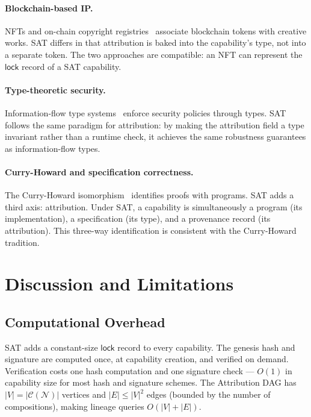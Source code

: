 \documentclass[12pt]{article}
\newcommand{\LOCK}{\mathsf{lock}}
\begin{document}
\paragraph{Blockchain-based IP.}
NFTs and on-chain copyright registries~\cite{bored2021} associate blockchain
tokens with creative works.  SAT differs in that attribution is baked into the
capability's type, not into a separate token.  The two approaches are
compatible: an NFT can represent the $\LOCK$ record of a SAT capability.

\paragraph{Type-theoretic security.}
Information-flow type systems~\cite{volpano1997, heintze1998} enforce security
policies through types.  SAT follows the same paradigm for attribution: by
making the attribution field a type invariant rather than a runtime check, it
achieves the same robustness guarantees as information-flow types.

\paragraph{Curry-Howard and specification correctness.}
The Curry-Howard isomorphism~\cite{howard1980} identifies proofs with programs.
SAT adds a third axis: attribution.  Under SAT, a capability is simultaneously
a program (its implementation), a specification (its type), and a provenance
record (its attribution).  This three-way identification is consistent with the
Curry-Howard tradition.

\section{Discussion and Limitations}
\label{sec:discussion}

\subsection{Computational Overhead}

SAT adds a constant-size $\LOCK$ record to every capability.  The genesis
hash and signature are computed once, at capability creation, and verified on
demand.  Verification costs one hash computation and one signature check —
$O(1)$ in capability size for most hash and signature schemes.  The Attribution
DAG has $|V| = |\mathcal{C}(\mathcal{N})|$ vertices and $|E| \le |V|^2$ edges
(bounded by the number of compositions), making lineage queries $O(|V| + |E|)$.
\end{document}

